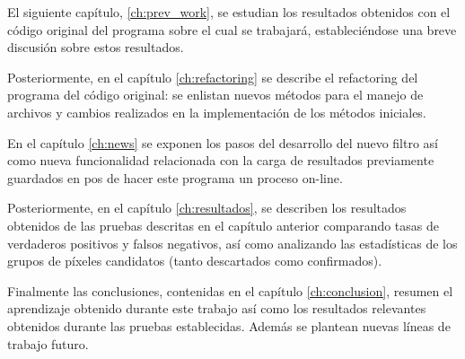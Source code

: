 
El siguiente cap\'itulo, \ref{ch:prev_work}, se estudian los resultados obtenidos con el c\'odigo original del programa sobre el cual se trabajar\'a, estableci\'endose una breve discusi\'on sobre estos resultados. 
\bigskip

Posteriormente, en el cap\'itulo \ref{ch:refactoring} se describe el refactoring del programa  del c\'odigo original: se enlistan nuevos m\'etodos para el manejo de archivos y cambios realizados en la implementaci\'on de los m\'etodos iniciales. 
\bigskip

En el cap\'itulo \ref{ch:news} se exponen los pasos del desarrollo del nuevo filtro as\'i como nueva funcionalidad relacionada con la carga de resultados previamente guardados en pos de hacer este programa un proceso on-line.
\bigskip

Posteriormente, en el cap\'itulo \ref{ch:resultados}, se describen los resultados obtenidos de las pruebas descritas en el cap\'itulo anterior comparando tasas de verdaderos positivos y falsos negativos, as\'i como analizando las estad\'isticas de los grupos de p\'ixeles candidatos (tanto descartados como confirmados).  
\bigskip

Finalmente las conclusiones, contenidas en el cap\'itulo \ref{ch:conclusion}, resumen el aprendizaje obtenido durante este trabajo as\'i como los resultados relevantes obtenidos durante las pruebas establecidas. Adem\'as se plantean nuevas l\'ineas de trabajo futuro.



